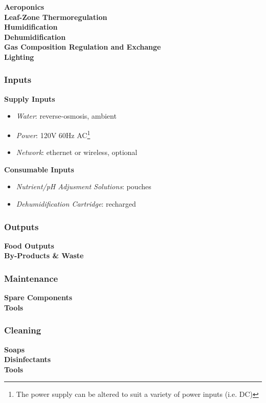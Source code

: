 \textbf{Aeroponics}\\


\textbf{Leaf-Zone Thermoregulation}\\


\textbf{Humidification}\\


\textbf{Dehumidification}\\


\textbf{Gas Composition Regulation and Exchange}\\


\textbf{Lighting}\\


\subsubsection{Inputs}

\textbf{Supply Inputs}
\begin{itemize}
    \item \textit{Water}: reverse-osmosis, ambient
    \item \textit{Power}: 120V 60Hz AC\footnote{The power supply can be altered to suit a variety of power inputs (i.e. DC)}
    \item \textit{Network}: ethernet or wireless, optional
\end{itemize}

\textbf{Consumable Inputs}
\begin{itemize}
    \item \textit{Nutrient/pH Adjusment Solutions}: pouches
    \item \textit{Dehumidification Cartridge}: recharged
\end{itemize}

\subsubsection{Outputs}

\textbf{Food Outputs}\\


\textbf{By-Products \& Waste}\\


\subsubsection{Maintenance}

\textbf{Spare Components}\\


\textbf{Tools}\\


\subsubsection{Cleaning}

\textbf{Soaps}\\


\textbf{Disinfectants}\\


\textbf{Tools}\\


